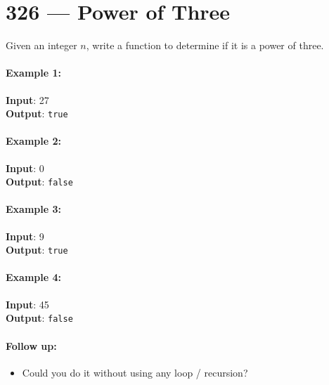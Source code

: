 \section{326 --- Power of Three}
Given an integer $n$, write a function to determine if it is a power of three.

\paragraph{Example 1:}

\begin{flushleft}
\textbf{Input}: 27
\\
\textbf{Output}: \texttt{true}
\end{flushleft}

\paragraph{Example 2:}

\begin{flushleft}
\textbf{Input}: 0
\\
\textbf{Output}: \texttt{false}
\end{flushleft}

\paragraph{Example 3:}

\begin{flushleft}
\textbf{Input}: 9
\\
\textbf{Output}: \texttt{true}
\end{flushleft}

\paragraph{Example 4:}

\begin{flushleft}
\textbf{Input}: 45
\\
\textbf{Output}: \texttt{false}
\end{flushleft}

\paragraph{Follow up:}
\begin{itemize}
\item Could you do it without using any loop / recursion?
\end{itemize}

